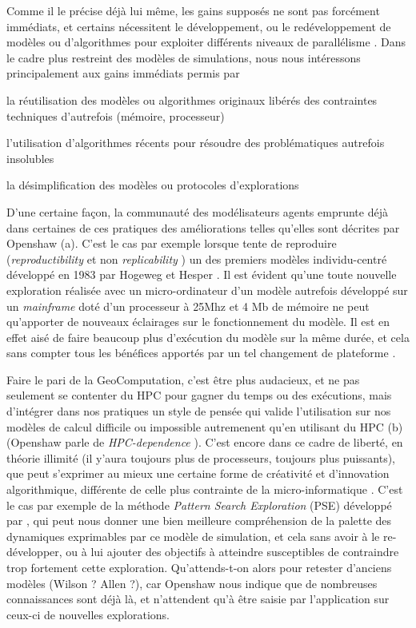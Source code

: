 Comme il le précise déjà lui même, les gains supposés ne sont pas forcément immédiats, et certains nécessitent le développement, ou le redéveloppement de modèles ou d'algorithmes pour exploiter différents niveaux de parallélisme . Dans le cadre plus restreint des modèles de simulations, nous nous intéressons principalement aux gains immédiats permis par \begin{enumerate*}[label=(\alph*)]  \item la réutilisation des modèles ou algorithmes originaux libérés des contraintes techniques d'autrefois (mémoire, processeur)  \item l'utilisation d'algorithmes récents pour résoudre des problématiques autrefois insolubles \item la désimplification des modèles ou protocoles d'explorations \end{enumerate*}

D'une certaine façon, la communauté des modélisateurs agents emprunte déjà dans certaines de ces pratiques des améliorations telles qu'elles sont décrites par Openshaw (a). C'est le cas par exemple lorsque \autocite{Brearcliffe2014} tente de reproduire (\textit{reproductibility} et non \textit{replicability} ) un des premiers modèles individu-centré développé en 1983 par Hogeweg et Hesper \autocite{Hogeweg1983}. Il est évident qu'une toute nouvelle exploration réalisée avec un micro-ordinateur d'un modèle autrefois développé sur un \textit{mainframe} doté d'un processeur à 25Mhz et 4 Mb de mémoire ne peut qu'apporter de nouveaux éclairages sur le fonctionnement du modèle. Il est en effet aisé de faire beaucoup plus d'exécution du modèle sur la même durée, et cela sans compter tous les bénéfices apportés par un tel changement de plateforme \autocite{Wilensky2007a}.

Faire le pari de la GeoComputation, c'est être plus audacieux, et ne pas seulement se contenter du HPC pour gagner du temps ou des exécutions, mais d'intégrer dans nos pratiques un style de pensée qui valide l'utilisation sur nos modèles de calcul difficile ou impossible autremenent qu'en utilisant du HPC (b)(Openshaw parle de \textit{HPC-dependence} ). C'est encore dans ce cadre de liberté, en théorie illimité (il y'aura toujours plus de processeurs, toujours plus puissants), que peut s'exprimer au mieux une certaine forme de créativité et d'innovation algorithmique, différente de celle plus contrainte de la micro-informatique \autocite[26-28]{Openshaw2000}. C'est le cas par exemple de la méthode \textit{Pattern Search Exploration} (PSE) développé par \textcite{Cherel2015}, qui peut nous donner une bien meilleure compréhension de la palette des dynamiques exprimables par ce modèle de simulation, et cela sans avoir à le re-développer, ou à lui ajouter des objectifs à atteindre susceptibles de contraindre trop fortement cette exploration. Qu'attends-t-on alors pour retester d'anciens modèles (Wilson ? Allen ?), car Openshaw nous indique que de nombreuses connaissances sont déjà là, et n'attendent qu'à être saisie par l'application sur ceux-ci de nouvelles explorations.

